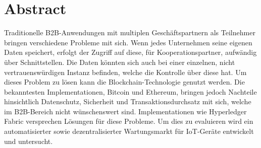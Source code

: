 \pagestyle{empty} %


\chapter*{Abstract} %
\label{cha:abtract}
Traditionelle B2B-Anwendungen mit multiplen Geschäftspartnern als Teilnehmer bringen verschiedene Probleme mit sich. Wenn jedes Unternehmen seine eigenen Daten speichert, erfolgt der Zugriff auf diese, für Kooperationspartner, aufwändig über Schnittstellen. Die Daten könnten sich auch bei einer einzelnen, nicht vertrauenswürdigen Instanz befinden, welche die Kontrolle über diese hat. Um dieses Problem zu lösen kann die Blockchain-Technologie genutzt werden. Die bekanntesten Implementationen, Bitcoin und Ethereum, bringen jedoch Nachteile hinsichtlich Datenschutz, Sicherheit und Transaktionsdurchsatz mit sich, welche im B2B-Bereich nicht wünschenswert sind. Implementationen wie Hyperledger Fabric versprechen Lösungen für diese Probleme. Um dies zu evaluieren wird ein automatisierter sowie dezentralisierter Wartungsmarkt für IoT-Geräte entwickelt und untersucht.

